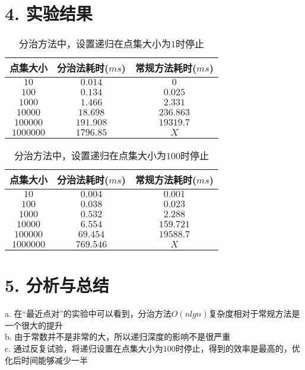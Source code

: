 \documentclass[12pt]{article}
\begin{document}
  \section*{4. 实验结果}
    \begin{table}[h!]
      \begin{center}
        \caption{分治方法中，设置递归在点集大小为$1$时停止}
        \begin{tabular}{c|c|c}
          \toprule
          \textbf{点集大小} & \textbf{分治法耗时($ms$)} & \textbf{常规方法耗时($ms$)}\\
          \midrule
          $10$ & $0.014$ & $0$\\
		  $100$ & $0.134$ & $0.025$\\
		  $1000$ & $1.466$ & $2.331$\\
		  $10000$ & $18.698$ & $236.863$\\
		  $100000$ & $191.908$ & $19319.7$\\
		  $1000000$ & $1796.85$ & $X$\\
          \bottomrule
        \end{tabular}
      \end{center}
    \end{table}
    \begin{table}[h!]
      \begin{center}
        \caption{分治方法中，设置递归在点集大小为$100$时停止}
        \begin{tabular}{c|c|c}
          \toprule
          \textbf{点集大小} & \textbf{分治法耗时($ms$)} & \textbf{常规方法耗时($ms$)}\\
          \midrule
          $10$ & $0.004$ & $0.001$\\
		  $100$ & $0.038$ & $0.023$\\
		  $1000$ & $0.532$ & $2.288$\\
		  $10000$ & $6.554$ & $159.721$\\
		  $100000$ & $69.454$ & $19588.7$\\
		  $1000000$ & $769.546$ & $X$\\
          \bottomrule
        \end{tabular}
      \end{center}
    \end{table}
  \section*{5. 分析与总结}
  a. 在“最近点对”的实验中可以看到，分治方法$O(nlgn)$复杂度相对于常规方法是一个很大的提升\\
  b. 由于常数并不是非常的大，所以递归深度的影响不是很严重\\
  c. 通过反复试验，将递归设置在点集大小为$100$时停止，得到的效率是最高的，优化后时间能够减少一半\\
\end{document}
